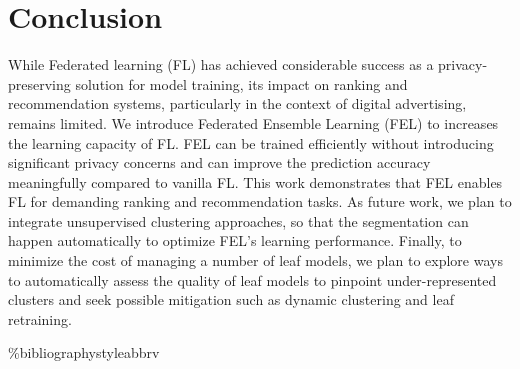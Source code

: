 \documentclass{article}
\begin{document}
\section{Conclusion}
\vspace{-0.25cm}
While Federated learning (FL) has achieved considerable success as a privacy-preserving solution for model training, its impact on ranking and recommendation systems, particularly in the context of digital advertising, remains limited. We introduce Federated Ensemble Learning (FEL) to increases the learning capacity of FL.
FEL can be trained efficiently without introducing significant privacy concerns and can improve the prediction accuracy meaningfully compared to vanilla FL.
This work demonstrates that FEL enables FL for demanding ranking and recommendation tasks.
%
As future work, we plan to integrate unsupervised clustering approaches, so that the segmentation can happen automatically to optimize FEL's learning performance.
%
Finally, to minimize the cost of managing a number of leaf models, we plan to explore ways to automatically assess the quality of leaf models to pinpoint under-represented clusters and seek possible mitigation such as dynamic clustering and leaf retraining.



\%bibliographystyle{abbrv}
%
\end{document}
